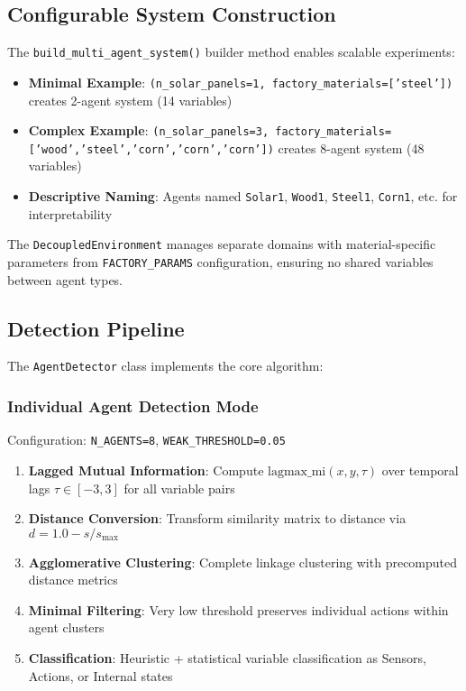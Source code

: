 \documentclass[10pt,conference]{IEEEtran}
\begin{document}
\subsection{Configurable System Construction}
The \texttt{build\_multi\_agent\_system()} builder method enables scalable experiments:
\begin{itemize}
  \item \textbf{Minimal Example}: \texttt{(n\_solar\_panels=1, factory\_materials=['steel'])} creates 2-agent system (14 variables)
  \item \textbf{Complex Example}: \texttt{(n\_solar\_panels=3, factory\_materials=['wood','steel','corn','corn','corn'])} creates 8-agent system (48 variables)  
  \item \textbf{Descriptive Naming}: Agents named \texttt{Solar1}, \texttt{Wood1}, \texttt{Steel1}, \texttt{Corn1}, etc. for interpretability
\end{itemize}

The \texttt{DecoupledEnvironment} manages separate domains with material-specific parameters from \texttt{FACTORY\_PARAMS} configuration, ensuring no shared variables between agent types.

\subsection{Detection Pipeline}
The \texttt{AgentDetector} class implements the core algorithm:

\subsubsection{Individual Agent Detection Mode}
Configuration: \texttt{N\_AGENTS=8}, \texttt{WEAK\_THRESHOLD=0.05}
\begin{enumerate}
  \item \textbf{Lagged Mutual Information}: Compute $\mathrm{lagmax\_mi}(x,y,\tau)$ over temporal lags $\tau \in [-3,3]$ for all variable pairs
  \item \textbf{Distance Conversion}: Transform similarity matrix to distance via $d = 1.0 - s/s_{\max}$
  \item \textbf{Agglomerative Clustering}: Complete linkage clustering with precomputed distance metrics
  \item \textbf{Minimal Filtering}: Very low threshold preserves individual actions within agent clusters
  \item \textbf{Classification}: Heuristic + statistical variable classification as Sensors, Actions, or Internal states
\end{enumerate}
\end{document}
